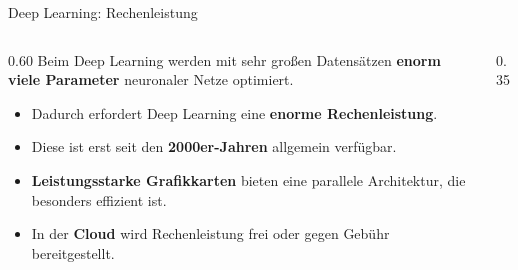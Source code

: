 \begin{frame}{Deep Learning: Rechenleistung}
\begin{columns}
\begin{column}{0.60\textwidth}
Beim Deep Learning werden mit sehr großen Datensätzen \textbf{enorm viele Parameter} neuronaler Netze optimiert.
\begin{itemize}
\item Dadurch erfordert Deep Learning eine \textbf{enorme Rechenleistung}.
\item Diese ist erst seit den \textbf{2000er-Jahren} allgemein verfügbar.
\item \textbf{Leistungsstarke Grafikkarten} bieten eine parallele Architektur, die besonders effizient ist.
\item In der \textbf{Cloud} wird Rechenleistung frei oder gegen Gebühr bereitgestellt.
\end{itemize}
\end{column}
\begin{column}{0.35\textwidth}
\centering

\end{column}
\end{columns}
\end{frame}


